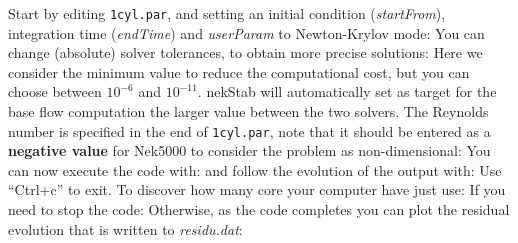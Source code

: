 \markdownRendererDocumentBegin
Start by editing \texttt{1cyl.par}, and setting an initial condition (\textit{startFrom}), integration time (\textit{endTime}) and \textit{userParam} to Newton-Krylov mode:\markdownRendererInterblockSeparator
{}\markdownRendererInterblockSeparator
{}You can change (absolute) solver tolerances, to obtain more precise solutions:\markdownRendererInterblockSeparator
{}\markdownRendererInterblockSeparator
{}Here we consider the minimum value to reduce the computational cost, but you can choose between $10^{-6}$ and $10^{-11}$. nekStab will automatically set as target for the base flow computation the larger value between the two solvers.\markdownRendererInterblockSeparator
{}The Reynolds number is specified in the end of \texttt{1cyl.par}, note that it should be entered as a \textbf{negative value} for Nek5000 to consider the problem as non-dimensional:\markdownRendererInterblockSeparator
{}\markdownRendererInterblockSeparator
{}\hline \bigskip You can now execute the code with:\markdownRendererInterblockSeparator
{}\markdownRendererInterblockSeparator
{}and follow the evolution of the output with:\markdownRendererInterblockSeparator
{}\markdownRendererInterblockSeparator
{}Use ``Ctrl+c'' to exit.\markdownRendererInterblockSeparator
{}To discover how many core your computer have just use:\markdownRendererInterblockSeparator
{}\markdownRendererInterblockSeparator
{}If you need to stop the code:\markdownRendererInterblockSeparator
{}\markdownRendererInterblockSeparator
{}Otherwise, as the code completes you can plot the residual evolution that is written to \textit{residu.dat}:\markdownRendererInterblockSeparator
{}\markdownRendererDocumentEnd